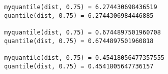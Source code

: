 \documentclass[11pt]{article}
\begin{document}
    \begin{Verbatim}[commandchars=\\\{\}]
myquantile(dist, 0.75) = 6.274430698436519
quantile(dist, 0.75) = 6.2744306984446885

myquantile(dist, 0.75) = 0.6744897501960708
quantile(dist, 0.75) = 0.6744897501960818

myquantile(dist, 0.75) = 0.45418056477357555
quantile(dist, 0.75) = 0.4541805647736157


    \end{Verbatim}


    
    
    
    
\end{document}
